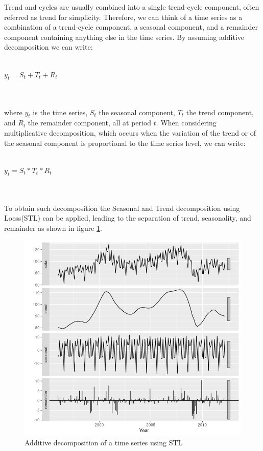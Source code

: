 \documentclass[a4paper, 12pt]{article} %
\begin{document}
	Trend and cycles are usually combined into a single trend-cycle component, often referred as trend for simplicity.
	Therefore, we can think of a time series as a combination of a trend-cycle component, a seasonal component, and a remainder component containing anything else in the time series.
	By assuming additive decomposition we can write:\\\\
	\centerline{$y_t = S_t + T_t + R_t$}\\\\
	where $y_t$ is the time series, $S_t$ the seasonal component, $T_t$ the trend component, and $R_t$ the remainder component, all at period $t$. When considering multiplicative decomposition, which occurs when the variation of the trend or of the seasonal component is proportional to the time series level, we can write: \\\\
	\centerline{$y_t = S_t * T_t * R_t$}\\\\
	To obtain such decomposition the Seasonal and Trend decomposition using Loess(STL) \cite{STL} can be applied, leading to the separation of trend, seasonality, and remainder as shown in figure \ref{fig:stl}.
	\begin{figure}
		\includegraphics[width=\linewidth]{img/sota_ts_additive_decomposition.png}
		\caption{Additive decomposition of a time series using STL}
		\label{fig:stl}
	\end{figure}
	
\end{document}
